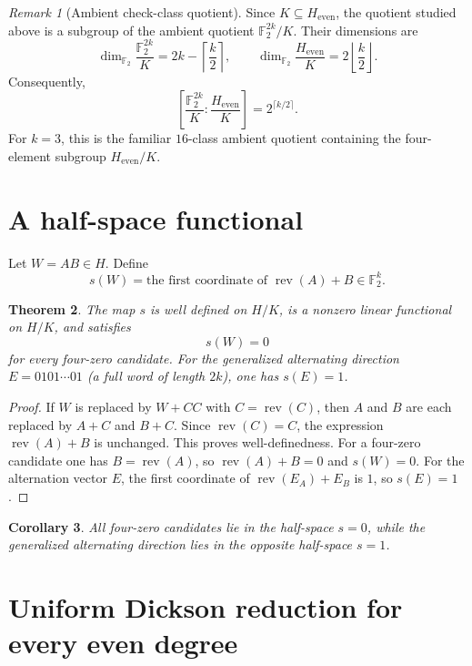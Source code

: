 \documentclass[11pt]{article}
\newtheorem{theorem}{Theorem}[section]
\newtheorem{corollary}[theorem]{Corollary}
\theoremstyle{definition}
\theoremstyle{remark}
\newtheorem{remark}[theorem]{Remark}
\begin{document}
\begin{remark}[Ambient check-class quotient]\label{rem:ambient-quotient}
Since \(K\subseteq H_{\mathrm{even}}\), the quotient studied above is a subgroup of the ambient quotient \(\mathbb F_2^{2k}/K\). Their dimensions are
\[
\dim_{\mathbb F_2}\frac{\mathbb F_2^{2k}}{K}
=
2k-\left\lceil\frac{k}{2}\right\rceil,
\qquad
\dim_{\mathbb F_2}\frac{H_{\mathrm{even}}}{K}
=
2\left\lfloor\frac{k}{2}\right\rfloor.
\]
Consequently,
\[
\left[\frac{\mathbb F_2^{2k}}{K}:\frac{H_{\mathrm{even}}}{K}\right]
=
2^{\lceil k/2\rceil}.
\]
For \(k=3\), this is the familiar \(16\)-class ambient quotient containing the four-element subgroup \(H_{\mathrm{even}}/K\).
\end{remark}

\section{A half-space functional}
\label{sec:halfspace}

Let $W=AB\in H$. Define
\[
s(W)=\text{the first coordinate of }\operatorname{rev}(A)+B\in\mathbb F_2^k.
\]

\begin{theorem}\label{thm:halfspace}
The map $s$ is well defined on $H/K$, is a nonzero linear functional on $H/K$, and satisfies
\[
s(W)=0
\]
for every four-zero candidate. For the generalized alternating direction $E=0101\cdots 01$ (a full word of length $2k$), one has $s(E)=1$.
\end{theorem}

\begin{proof}
If $W$ is replaced by $W+CC$ with $C=\operatorname{rev}(C)$, then $A$ and $B$ are each replaced by $A+C$ and $B+C$. Since $\operatorname{rev}(C)=C$, the expression $\operatorname{rev}(A)+B$ is unchanged. This proves well-definedness. For a four-zero candidate one has $B=\operatorname{rev}(A)$, so $\operatorname{rev}(A)+B=0$ and $s(W)=0$. For the alternation vector $E$, the first coordinate of $\operatorname{rev}(E_A)+E_B$ is $1$, so $s(E)=1$.
\end{proof}

\begin{corollary}
All four-zero candidates lie in the half-space $s=0$, while the generalized alternating direction lies in the opposite half-space $s=1$.
\end{corollary}

\section{Uniform Dickson reduction for every even degree}
\label{sec:uniform}
\end{document}
